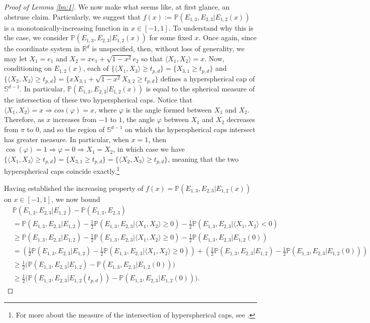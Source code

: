 \documentclass{article}
\begin{document}
\begin{proof}[Proof of Lemma \ref{lm:1}]
We now make what seems like, at first glance, an abstruse claim. Particularly, we suggest that $f(x) := \mathbb{P}(E_{1, 3}, E_{2, 3} | E_{1,2}(x))$ is a monotonically-increasing function in $x \in [-1, 1]$. To understand why this is the case, we consider  $\mathbb{P}(E_{1, 3}, E_{2, 3} | E_{1,2}(x))$ for some fixed $x$. 
Once again, since the coordinate system in $\mathbb{R}^d$ is unspecified, then, without loss of generality, we may let $X_1 = e_1$ and $X_2 = xe_1 + \sqrt{1 -x^2}e_2$ so that $\langle X_1, X_2 \rangle  = x$. Now, conditioning on $E_{1,2}(x)$, each of $\{ \langle X_1, X_3 \rangle \geq t_{p,d} \} = \{ X_{3,1} \geq t_{p,d} \}$ and $\{ \langle X_2, X_3 \rangle \geq t_{p,d} \} = \{ xX_{3,1} + \sqrt{1-x^2}X_{3,2} \geq t_{p,d} \}$ defines a hyperspherical cap of $\mathbb{S}^{d-1}$. In particular, $\mathbb{P}(E_{1, 3}, E_{2, 3} | E_{1,2}(x))$ is equal to the spherical measure of the intersection of these two hyperspherical caps. Notice that $\langle X_1, X_2 \rangle = x \Rightarrow cos(\varphi) = x$, where $\varphi$ is the angle formed between $X_1$ and $X_2$. Therefore, as $x$ increases from $-1$ to $1$, the angle $\varphi$ between $X_1$ and $X_2$ decreases from $\pi$ to $0$, and so the region of $\mathbb{S}^{d-1}$ on which the hyperspherical caps intersect has greater measure. In particular, when $x = 1$, then $\cos(\varphi) = 1 \Rightarrow \varphi = 0 \Rightarrow X_1 = X_2$, in which case we have $\{ \langle X_1, X_3 \rangle \geq t_{p,d} \} = \{ X_{3,1} \geq t_{p,d} \} = \{ \langle X_2, X_3 \rangle \geq t_{p,d} \}$, meaning that the two hyperspherical caps coincide exactly.\footnote{For more about the measure of the intersection of hyperspherical caps, see \cite{lee2014concise}.}

Having established the increasing property of $f(x) = \mathbb{P}(E_{1,3}, E_{2,3} | E_{1, 2}(x))$ on $x \in [-1, 1]$, we now bound 
\begin{align}
    &\mathbb{P}(E_{1,3}, E_{2,3} | E_{1,2}) - \mathbb{P}(E_{1,3},E_{2,3}) \nonumber\\
    &= \mathbb{P}(E_{1,3}, E_{2,3} | E_{1,2}) - \frac{1}{2}\mathbb{P}(E_{1, 3}, E_{2,3}| \langle X_1, X_2 \rangle \geq 0) - \frac{1}{2}\mathbb{P}(E_{1, 3}, E_{2,3}| \langle X_1, X_2 \rangle < 0) \nonumber\\
    &\geq \mathbb{P}(E_{1,3}, E_{2,3} | E_{1,2}) - \frac{1}{2}\mathbb{P}(E_{1, 3}, E_{2,3}| \langle X_1, X_2 \rangle \geq 0) - \frac{1}{2}\mathbb{P}(E_{1, 3}, E_{2,3}| E_{1,2}(0)) \nonumber\\
    &= \left( \frac{1}{2}\mathbb{P}(E_{1,3}, E_{2,3} | E_{1,2}) - \frac{1}{2}\mathbb{P}(E_{1, 3}, E_{2,3}| \langle X_1, X_2 \rangle \geq 0) \right) + \left( \frac{1}{2}\mathbb{P}(E_{1,3}, E_{2,3} | E_{1,2})  - \frac{1}{2}\mathbb{P}(E_{1, 3}, E_{2,3}| E_{1,2}(0)) \right) \nonumber\\
    &\geq  \frac{1}{2} \bigg( \mathbb{P}(E_{1,3}, E_{2,3} | E_{1,2})  - \mathbb{P}(E_{1, 3}, E_{2,3}| E_{1,2}(0)) \bigg) \nonumber\\
    &\geq \frac{1}{2} \bigg( \mathbb{P}(E_{1,3}, E_{2,3} | E_{1,2}(t_{p,d}))  - \mathbb{P}(E_{1, 3}, E_{2,3}| E_{1,2}(0)) \bigg). \label{eq4}
\end{align}


\end{proof}
\end{document}
